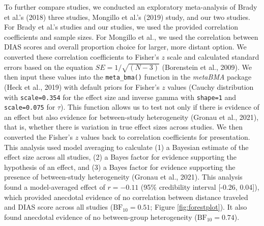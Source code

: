 \documentclass[
  pub,floatsintext]{apa6}
\begin{document}
To further compare studies, we conducted an exploratory meta-analysis of Brady et al.'s (2018) three studies, Mongillo et al.'s (2019) study, and our two studies. For Brady et al.'s studies and our studies, we used the provided correlation coefficients and sample sizes. For Mongillo et al., we used the correlation between DIAS scores and overall proportion choice for larger, more distant option. We converted these correlation coefficients to Fisher's \(z\) scale and calculated standard errors based on the equation \(SE = 1 / \sqrt{(N - 3)}\) (Borenstein et al., 2009). We then input these values into the \texttt{meta\_bma()} function in the \emph{metaBMA} package (Heck et al., 2019) with default priors for Fisher's \(z\) values (Cauchy distribution with \texttt{scale=0.354} for the effect size and inverse gamma with \texttt{shape=1} and \texttt{scale=0.075} for \(\tau\)). This function allows us to test not only if there is evidence of an effect but also evidence for between-study heterogeneity (Gronau et al., 2021), that is, whether there is variation in true effect sizes across studies. We then converted the Fisher's \(z\) values back to correlation coefficients for presentation. This analysis used model averaging to calculate (1) a Bayesian estimate of the effect size across all studies, (2) a Bayes factor for evidence supporting the hypothesis of an effect, and (3) a Bayes factor for evidence supporting the presence of between-study heterogeneity (Gronau et al., 2021). This analysis found a model-averaged effect of \(r = -0.11\) (95\% credibility interval {[}-0.26, 0.04{]}), which provided anecdotal evidence of no correlation between distance traveled and DIAS score across all studies (\(\mathrm{BF}_{\textrm{10}} = 0.51\); Figure \ref{fig:forestplot}). It also found anecdotal evidence of no between-group heterogeneity (\(\mathrm{BF}_{\textrm{10}} = 0.74\)).
\end{document}
